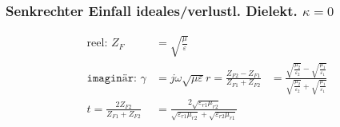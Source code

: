 \subsubsection[Senkrechter Einfall ideales/verlustl. Dielekt.]{Senkrechter Einfall ideales/verlustl. Dielekt. $\kappa = 0$}


\begin{align*}
    \text{reel: }Z_F          & = \sqrt{\frac{\mu}{\varepsilon}} \\
    \texttt{imaginär: }\gamma & = j \omega\sqrt{\mu\varepsilon}
    r = \frac{Z_{F2} - Z_{F1}}{Z_{F1} + Z_{F2}} &= \frac{\sqrt{\frac{\mu_2}{\varepsilon_2}} - \sqrt{\frac{\mu_1}{\varepsilon_1}}}{\sqrt{\frac{\mu_2}{\varepsilon_2}} + \sqrt{\frac{\mu_1}{\varepsilon_1}}} \\
    t = \frac{2 Z_{F2}}{Z_{F1} + Z_{F2}} &= \frac{2\sqrt{\varepsilon_{r1}\mu_{r2}}}{\sqrt{\varepsilon_{r1}\mu_{r2}}+\sqrt{\varepsilon_{r2}\mu_{r1}}}
\end{align*}




